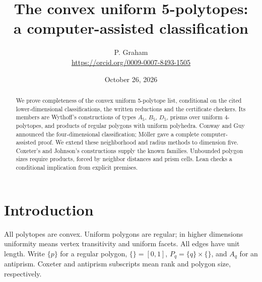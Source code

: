 \documentclass[11pt]{article}
\title{The convex uniform 5-polytopes:\\ a computer-assisted classification}
\author{P. Graham\\ \small\url{https://orcid.org/0009-0007-8493-1505}}
\date{October 26, 2026}
\theoremstyle{definition}
\theoremstyle{remark}
\begin{document}
\maketitle
\begin{abstract}
We prove completeness of the convex uniform 5-polytope list, conditional
on the cited lower-dimensional classifications, the written reductions and
the certificate checkers. Its members are Wythoff's constructions of types
$A_5$, $B_5$, $D_5$, prisms over uniform 4-polytopes, and products of regular
polygons with uniform polyhedra. Conway and Guy announced the four-dimensional classification; Möller
gave a complete computer-assisted proof. We extend these neighborhood and
radius methods to dimension five. Coxeter's and Johnson's constructions
supply the known families. Unbounded polygon sizes require products, forced by neighbor distances and prism cells. Lean checks a conditional implication from explicit premises.
\end{abstract}

\section{Introduction}\label{sec:intro}\label{sec:models}
All polytopes are convex. Uniform polygons are regular; in higher
dimensions uniformity means vertex transitivity and uniform facets.
All edges have unit length. Write $\{p\}$ for a regular polygon,
$\{\}=[0,1]$, $P_q=\{q\}\times\{\}$, and $A_q$ for an antiprism.
Coxeter and antiprism subscripts mean rank and polygon size, respectively.
\end{document}
